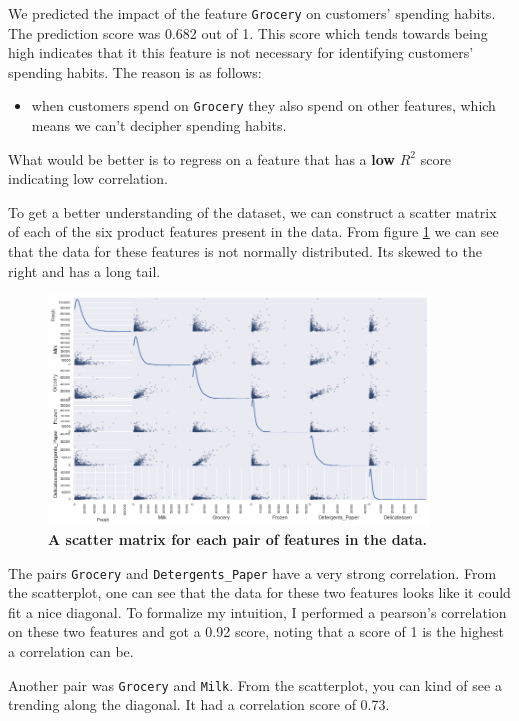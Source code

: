 \documentclass[twoside,openright,titlepage,numbers=noenddot,headinclude,%
               footinclude=true,cleardoublepage=empty,abstractoff,BCOR=5mm,%
               paper=a4,fontsize=11pt,ngerman,american]{scrreprt}
\numberwithin{theorem}{chapter}
\numberwithin{definition}{chapter}
\numberwithin{algorithm}{chapter}
\numberwithin{figure}{chapter}
\numberwithin{table}{chapter}
\numberwithin{equation}{chapter}
\begin{document}
We predicted the impact of the feature \texttt{Grocery} on customers' spending habits. The prediction score was 0.682 out of 1. This score which tends towards being high indicates that it this feature is not necessary for identifying customers' spending habits. The reason is as follows: 
\begin {itemize}
\item when customers spend on \texttt{Grocery} they also spend on other features, which means we can't decipher spending habits. 
\end{itemize}
What would be better is to regress on a feature that has a \textbf{low} $R^2$ score indicating low correlation.


To get a better understanding of the dataset, we can construct a scatter matrix of each of the six product features present in the data. From figure \ref{scatterplot} we can see that the data for these features is not normally distributed. Its skewed to the right and has a long tail.
\begin{figure}[!hbtp]
\centering
   
    \includegraphics[width=0.9\textwidth]{figures/scatterplot}
    
    
    \caption{\textbf{A scatter matrix for each pair of features in the data.}}\label{scatterplot}
\end{figure}

The pairs \texttt{Grocery} and \texttt{Detergents\_Paper} have a very strong correlation. From the scatterplot, one can see that the data for these two features looks like it could fit a nice diagonal. To formalize my intuition, I performed a pearson's correlation on these two features and got a 0.92 score, noting that a score of 1 is the highest a correlation can be.

Another pair was \texttt{Grocery} and \texttt{Milk}. From the scatterplot, you can kind of see a trending along the diagonal. It had a correlation score of 0.73.
\end{document}
